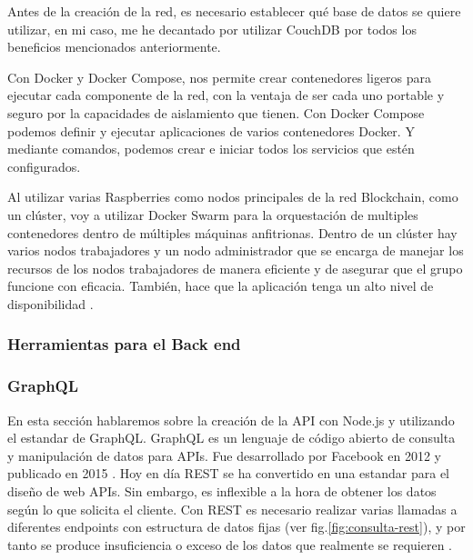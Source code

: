 \vspace{5mm}

\noindent Antes de la creación de la red, es necesario establecer qué base de datos se quiere utilizar, en mi caso, me 
he decantado por utilizar CouchDB por todos los beneficios mencionados anteriormente.

\vspace{5mm}

\noindent Con Docker y Docker Compose, nos permite crear contenedores ligeros para ejecutar cada componente de la red, 
con la ventaja de ser cada uno portable y seguro por la capacidades de aislamiento que tienen. Con Docker Compose 
podemos definir y ejecutar aplicaciones de varios contenedores Docker. Y mediante comandos, podemos crear e iniciar 
todos los servicios que estén configurados.

\vspace{5mm}

\noindent Al utilizar varias Raspberries como nodos principales de la red Blockchain, como un clúster, voy a utilizar 
Docker Swarm para la orquestación de multiples contenedores dentro de múltiples máquinas anfitrionas. Dentro de un 
clúster hay varios nodos trabajadores y un nodo administrador que se encarga de manejar los recursos de los nodos 
trabajadores de manera eficiente y de asegurar que el grupo funcione con eficacia. También, hace que la aplicación 
tenga un alto nivel de disponibilidad \cite{what-is-docker-swarm}.

\subsubsection{Herramientas para el Back end}

\subsubsection*{GraphQL}

En esta sección hablaremos sobre la creación de la API con Node.js y utilizando el estandar de GraphQL. GraphQL es un 
lenguaje de código abierto de consulta y manipulación de datos para APIs. Fue desarrollado por Facebook en 2012 y 
publicado en 2015 \cite{graphql}. Hoy en día REST se ha convertido en una estandar para el diseño de web APIs. Sin 
embargo, es inflexible a la hora de obtener los datos según lo que solicita el cliente. Con REST es necesario realizar 
varias llamadas a diferentes endpoints con estructura de datos fijas (ver fig.\ref{fig:consulta-rest}), y por tanto se 
produce insuficiencia o exceso de los datos que realmente se requieren \cite{graphql-vs-rest}. 

